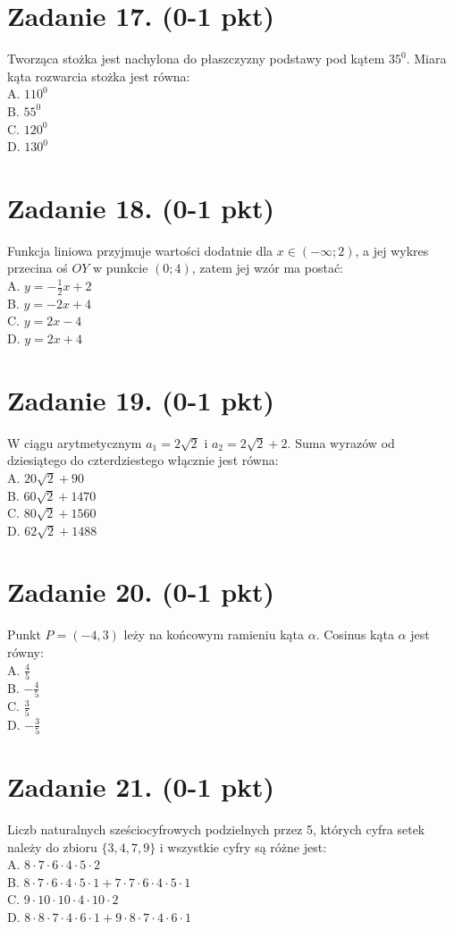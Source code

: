 \documentclass[10pt]{article}
\begin{document}
\section*{Zadanie 17. (0-1 pkt)}
Tworząca stożka jest nachylona do płaszczyzny podstawy pod kątem \(35^{0}\). Miara kąta rozwarcia stożka jest równa:\\
A. \(110^{0}\)\\
B. \(55^{0}\)\\
C. \(120^{0}\)\\
D. \(130^{0}\)

\section*{Zadanie 18. (0-1 pkt)}
Funkcja liniowa przyjmuje wartości dodatnie dla \(x \in(-\infty ; 2)\), a jej wykres przecina oś \(O Y\) w punkcie \((0 ; 4)\), zatem jej wzór ma postać:\\
A. \(y=-\frac{1}{2} x+2\)\\
B. \(y=-2 x+4\)\\
C. \(y=2 x-4\)\\
D. \(y=2 x+4\)

\section*{Zadanie 19. (0-1 pkt)}
W ciągu arytmetycznym \(a_{1}=2 \sqrt{2}\) i \(a_{2}=2 \sqrt{2}+2\). Suma wyrazów od dziesiątego do czterdziestego włącznie jest równa:\\
A. \(20 \sqrt{2}+90\)\\
B. \(60 \sqrt{2}+1470\)\\
C. \(80 \sqrt{2}+1560\)\\
D. \(62 \sqrt{2}+1488\)

\section*{Zadanie 20. (0-1 pkt)}
Punkt \(P=(-4,3)\) leży na końcowym ramieniu kąta \(\alpha\). Cosinus kąta \(\alpha\) jest równy:\\
A. \(\frac{4}{5}\)\\
B. \(-\frac{4}{5}\)\\
C. \(\frac{3}{5}\)\\
D. \(-\frac{3}{5}\)

\section*{Zadanie 21. (0-1 pkt)}
Liczb naturalnych sześciocyfrowych podzielnych przez 5, których cyfra setek należy do zbioru \(\{3,4,7,9\}\) i wszystkie cyfry są różne jest:\\
A. \(8 \cdot 7 \cdot 6 \cdot 4 \cdot 5 \cdot 2\)\\
B. \(8 \cdot 7 \cdot 6 \cdot 4 \cdot 5 \cdot 1+7 \cdot 7 \cdot 6 \cdot 4 \cdot 5 \cdot 1\)\\
C. \(9 \cdot 10 \cdot 10 \cdot 4 \cdot 10 \cdot 2\)\\
D. \(8 \cdot 8 \cdot 7 \cdot 4 \cdot 6 \cdot 1+9 \cdot 8 \cdot 7 \cdot 4 \cdot 6 \cdot 1\)
\end{document}

